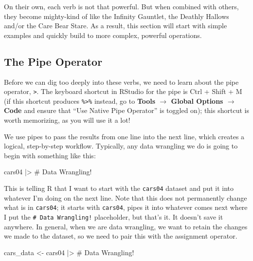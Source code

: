 \documentclass[
  letterpaper,
]{book}
\newenvironment{Shaded}{\begin{snugshade}}{\end{snugshade}}
\newcommand{\CommentTok}[1]{\textcolor[rgb]{0.37,0.37,0.37}{#1}}
\newcommand{\NormalTok}[1]{\textcolor[rgb]{0.00,0.23,0.31}{#1}}
\newcommand{\OtherTok}[1]{\textcolor[rgb]{0.00,0.23,0.31}{#1}}
\newcommand{\SpecialCharTok}[1]{\textcolor[rgb]{0.37,0.37,0.37}{#1}}
\begin{document}
On their own, each verb is not that powerful. But when combined with
others, they become mighty-kind of like the Infinity Gauntlet, the
Deathly Hallows and/or the Care Bear Stare. As a result, this section
will start with simple examples and quickly build to more complex,
powerful operations.

\subsection{The Pipe Operator}\label{the-pipe-operator}

Before we can dig too deeply into these verbs, we need to learn about
the pipe operator, \texttt{\textbar{}\textgreater{}}. The keyboard
shortcut in RStudio for the pipe is Ctrl + Shift + M (if this shortcut
produces \texttt{\%\textgreater{}\%} instead, go to \textbf{Tools
\(\rightarrow\) Global Options \(\rightarrow\) Code} and ensure that
``Use Native Pipe Operator'' is toggled on); this shortcut is worth
memorizing, as you will use it a lot!

We use pipes to pass the results from one line into the next line, which
creates a logical, step-by-step workflow. Typically, any data wrangling
we do is going to begin with something like this:

\begin{Shaded}
\begin{Highlighting}[]
\NormalTok{cars04 }\SpecialCharTok{|\textgreater{}} 
  \CommentTok{\# Data Wrangling!}
\end{Highlighting}
\end{Shaded}

This is telling R that I want to start with the \texttt{cars04} dataset
and put it into whatever I'm doing on the next line. Note that this does
not permanently change what is in \texttt{cars04}; it starts with
\texttt{cars04}, pipes it into whatever comes next where I put the
\texttt{\#\ Data\ Wrangling!} placeholder, but that's it. It doesn't
save it anywhere. In general, when we are data wrangling, we want to
retain the changes we made to the dataset, so we need to pair this with
the assignment operator.

\begin{Shaded}
\begin{Highlighting}[]
\NormalTok{cars\_data }\OtherTok{\textless{}{-}}\NormalTok{ cars04 }\SpecialCharTok{|\textgreater{}} 
  \CommentTok{\# Data Wrangling!}
\end{Highlighting}
\end{Shaded}
\end{document}
